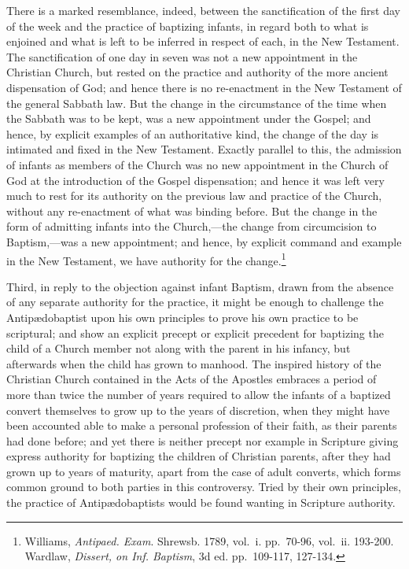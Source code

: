 \documentclass[]{book}
\begin{document}
There is a marked resemblance, indeed, between the sanctification of the first day of the week and the practice of baptizing infants, in regard both to what is enjoined and what is left to be inferred in respect of each, in the New Testament. The sanctification of one day in seven was not a new appointment in the Christian Church, but rested on the practice and authority of the more ancient dispensation of God; and hence there is no re-enactment in the New Testament of the general Sabbath law. But the change in the circumstance of the time when the Sabbath was to be kept, was a new appointment under the Gospel; and hence, by explicit examples of an authoritative kind, the change of the day is intimated and fixed in the New Testament. Exactly parallel to this, the admission of infants as members of the Church was no new appointment in the Church of God at the introduction of the Gospel dispensation; and hence it was left very much to rest for its authority on the previous law and practice of the Church, without any re-enactment of what was binding before. But the change in the form of admitting infants into the Church,---the change from circumcision to Baptism,---was a new appointment; and hence, by explicit command and example in the New Testament, we have authority for the change.\footnote{Williams, \emph{Antipaed. Exam}. Shrewsb. 1789, vol.~i. pp.~70-96, vol.~ii. 193-200. Wardlaw, \emph{Dissert, on Inf. Baptism}, 3d ed. pp.~109-117, 127-134.}

Third, in reply to the objection against infant Baptism, drawn from the absence of any separate authority for the practice, it might be enough to challenge the Antipædobaptist upon his own principles to prove his own practice to be scriptural; and show an explicit precept or explicit precedent for baptizing the child of a Church member not along with the parent in his infancy, but afterwards when the child has grown to manhood. The inspired history of the Christian Church contained in the Acts of the Apostles embraces a period of more than twice the number of years required to allow the infants of a baptized convert themselves to grow up to the years of discretion, when they might have been accounted able to make a personal profession of their faith, as their parents had done before; and yet there is neither precept nor example in Scripture giving express authority for baptizing the children of Christian parents, after they had grown up to years of maturity, apart from the case of adult converts, which forms common ground to both parties in this controversy. Tried by their own principles, the practice of Antipædobaptists would be found wanting in Scripture authority.
\end{document}
